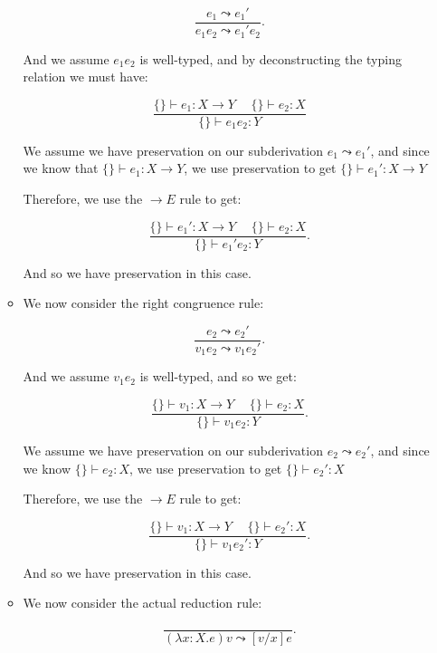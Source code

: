 \begin{enumerate}
\begin{itemize}
          \[
            \frac{e_1 \leadsto e_1'}{e_1 e_2 \leadsto e_1' e_2}
          .\] 

          And we assume $e_1 e_2$ is well-typed, and by deconstructing the typing relation we must have:

          \[
            \frac{\{\} \vdash e_1 : X \rightarrow Y \hspace{15pt} \{\} \vdash e_2 : X}{\{\} \vdash e_1 e_2 : Y}
          \] 

          We assume we have preservation on our subderivation $e_1 \leadsto e_1'$, and since we know that $\{\} \vdash e_1 : X \rightarrow Y$, we use preservation to get $\{\} \vdash e_1' : X \rightarrow Y$

          Therefore, we use the $\rightarrow E$ rule to get:

          \[
            \frac{\{\} \vdash e_1' : X \rightarrow Y \hspace{15pt} \{\} \vdash e_2 : X}{\{\} \vdash e_1' e_2 : Y}
          .\] 

          And so we have preservation in this case.

        \item
          We now consider the right congruence rule:

          \[
            \frac{e_2 \leadsto e_2'}{v_1 e_2 \leadsto v_1 e_2'}
          .\] 

          And we assume $v_1 e_2$ is well-typed, and so we get:

          \[
            \frac{\{\} \vdash v_1 : X \rightarrow Y \hspace{15pt} \{\} \vdash e_2 : X}{\{\} \vdash v_1 e_2 : Y}
          .\] 

          We assume we have preservation on our subderivation $e_2 \leadsto e_2'$, and since we know $\{\} \vdash e_2 : X$, we use preservation to get $\{\} \vdash e_2' : X$

          Therefore, we use the $\rightarrow E$ rule to get:

          \[
            \frac{\{\} \vdash v_1 : X \rightarrow Y \hspace{15pt} \{\} \vdash e_2' : X}{\{\} \vdash v_1 e_2' : Y}
          .\] 

          And so we have preservation in this case.

        \item
          We now consider the actual reduction rule:

          \[
            \frac{}{(\lambda x : X . e) v \leadsto [v / x]e}
          .\] 


\end{itemize}
\end{enumerate}
